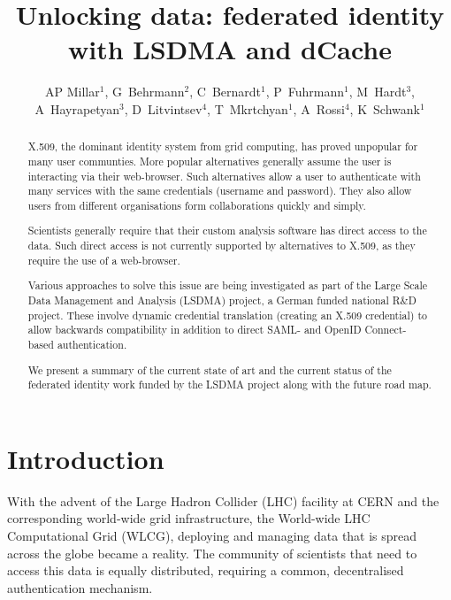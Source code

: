 \documentclass[a4paper]{jpconf}
\begin{document}
\title{Unlocking data: federated identity with LSDMA and dCache}

\author{AP Millar$^1$, G~Behrmann$^2$, C~Bernardt$^1$, P~Fuhrmann$^1$,
  M~Hardt$^3$, A~Hayrapetyan$^3$, D~Litvintsev$^4$, T~Mkrtchyan$^1$,
  A~Rossi$^4$, K~Schwank$^1$}

\address{$^1$ IT Dept., DESY, Notkestrasse 85, Hamburg, Germany}
\address{$^2$ NORDUnet, Copenhagen, Denmark}
\address{$^3$ KIT}
\address{$^4$ Fermilab, Chicago, IL, USA}


\begin{abstract}
X.509, the dominant identity system from grid computing, has proved
unpopular for many user communties. More popular alternatives
generally assume the user is interacting via their web-browser. Such
alternatives allow a user to authenticate with many services with the
same credentials (username and password). They also allow users from
different organisations form collaborations quickly and simply.

Scientists generally require that their custom analysis software has
direct access to the data. Such direct access is not currently
supported by alternatives to X.509, as they require the use of a
web-browser.

Various approaches to solve this issue are being investigated as part
of the Large Scale Data Management and Analysis (LSDMA) project, a
German funded national R\&D project. These involve dynamic credential
translation (creating an X.509 credential) to allow backwards
compatibility in addition to direct SAML- and OpenID Connect-based
authentication.

We present a summary of the current state of art and the current
status of the federated identity work funded by the LSDMA project
along with the future road map.
\end{abstract}

\section{Introduction}
With the advent of the Large Hadron Collider (LHC) facility at CERN
and the corresponding world-wide grid infrastructure, the World-wide
LHC Computational Grid (WLCG), deploying and managing data that is
spread across the globe became a reality.  The community of scientists
that need to access this data is equally distributed, requiring a
common, decentralised authentication mechanism.
\end{document}
